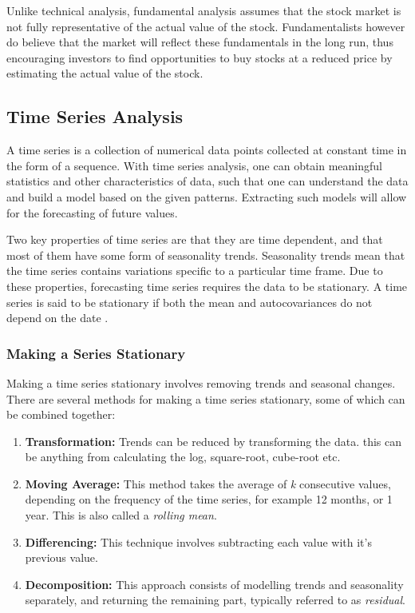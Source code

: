 \documentclass{UoYCSproject}
\begin{document}
Unlike technical analysis, fundamental analysis assumes that the stock market is not fully representative of the actual value of the stock. Fundamentalists however do believe that the market will reflect these fundamentals in the long run, thus encouraging investors to find opportunities to buy stocks at a reduced price by estimating the actual value of the stock. 

\subsection{Time Series Analysis}
A time series is a collection of numerical data points collected at constant time in the form of a sequence. With time series analysis, one can obtain meaningful statistics and other characteristics of data, such that one can understand the data and build a model based on the given patterns. Extracting such models will allow for the forecasting of future values. 

Two key properties of time series are that they are time dependent, and that most of them have some form of seasonality trends. Seasonality trends mean that the time series contains variations specific to a particular time frame. Due to these properties, forecasting time series requires the data to be stationary. A time series is said to be stationary if both the mean and autocovariances do not depend on the date \cite{hamilton1994time}. 

\subsubsection{Making a Series Stationary}
\label{subsec:stationary}
Making a time series stationary involves removing trends and seasonal changes. There are several methods for making a time series stationary, some of which can be combined together:
\begin{enumerate}
    \item \textbf{Transformation:} Trends can be reduced by transforming the data. this can be anything from calculating the log, square-root, cube-root etc.  
    \item \textbf{Moving Average:} This method takes the average of \textit{k} consecutive values, depending on the frequency of the time series, for example 12 months, or 1 year. This is also called a \textit{rolling mean}. 
    \item \textbf{Differencing:} This technique involves subtracting each value with it's previous value.
    \item \textbf{Decomposition:} This approach consists of modelling trends and seasonality separately, and returning the remaining part, typically referred to as \textit{residual}. 
\end{enumerate}
\end{document}
